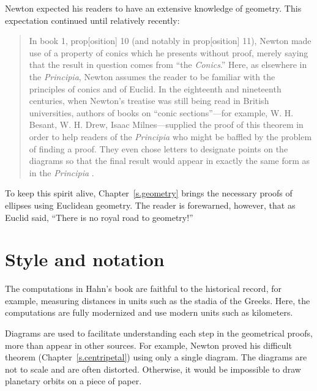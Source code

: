 Newton expected his readers to have an extensive knowledge of geometry. This expectation continued until relatively recently:
\begin{quote}
In book 1, prop[osition] 10 (and notably in prop[osition] 11), Newton made use of a property of conics which he presents without proof, merely saying that the result in question comes from ``the \textit{Conics}.'' Here, as elsewhere in the \textit{Principia}, Newton assumes the reader to be familiar with the principles of conics and of Euclid. In the eighteenth and nineteenth centuries, when Newton's treatise was still being read in British universities, authors of books on ``conic sections''---for example, W. H. Besant, W. H. Drew, Isaac Milnes---supplied the proof of this theorem in order to help readers of the \textit{Principia} who might be baffled by the problem of finding a proof. They even chose letters to designate points on the diagrams so that the final result would appear in exactly the same form as in the \textit{Principia} \cite[p.~330]{newton-cohen}.
\end{quote}

To keep this spirit alive, Chapter~\ref{s.geometry} brings the necessary proofs of ellipses using Euclidean geometry. The reader is forewarned, however, that as Euclid said, ``There is no royal road to geometry!''

\section*{Style and notation}

The computations in Hahn's book are faithful to the historical record, for example, measuring distances in units such as the stadia of the Greeks. Here,  the computations are fully modernized and use modern units such as kilometers. 

Diagrams are used to facilitate understanding each step in the geometrical proofs, more than appear in other sources. For example, Newton proved his difficult theorem (Chapter~\ref{s.centripetal}) using only a single diagram. The diagrams are not to scale and are often distorted. Otherwise, it would be impossible to draw planetary orbits on a piece of paper.

